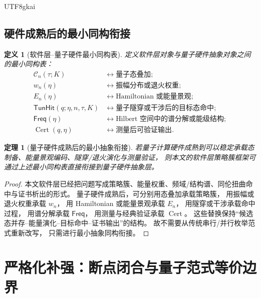 \documentclass[12pt]{article}
\newtheorem{definition}{定义}[section]
\newtheorem{theorem}{定理}[section]
\newcommand{\TunHit}{\mathsf{TunHit}}
\newcommand{\Freq}{\mathsf{Freq}}
\newcommand{\Cert}{\operatorname{Cert}}
\begin{document}
\begin{CJK*}{UTF8}{gkai}
\subsection{硬件成熟后的最小同构衔接}
\label{subsec:tex53-quantum-hardware}

\begin{definition}[软件层--量子硬件最小同构表]
定义软件层对象与量子硬件抽象对象之间的最小同构表：
\[
\begin{aligned}
  \mathcal C_n(\tau;K)
  &\longleftrightarrow
  \text{量子态叠加};\\
  w_n(\eta)
  &\longleftrightarrow
  \text{振幅分布或退火权重};\\
  E_n(\eta)
  &\longleftrightarrow
  \text{Hamiltonian 或能量景观};\\
  \TunHit(q;\eta,n,\tau,K)
  &\longleftrightarrow
  \text{量子隧穿或干涉后的目标态命中};\\
  \Freq(\eta)
  &\longleftrightarrow
  \text{Hilbert 空间中的谱分解或能级结构};\\
  \Cert(q,\eta)
  &\longleftrightarrow
  \text{测量后可验证输出}.
\end{aligned}
\]
\end{definition}

\begin{theorem}[量子硬件成熟后的最小抽象衔接]
\label{thm:tex53-quantum-isomorphism}
若量子计算硬件成熟到可以稳定承载态制备、能量景观编码、隧穿/退火演化与测量验证，
则本文的软件层策略簇框架可通过上述最小同构表直接衔接到量子硬件抽象层。
\end{theorem}

\begin{proof}
本文软件层已经把问题写成策略簇、能量权重、频域/结构谱、同伦扭曲命中与证书析出的形式。
量子硬件成熟后，可分别用态叠加承载策略簇，
用振幅或退火权重承载 \(w_n\)，
用 Hamiltonian 或能量景观承载 \(E_n\)，
用隧穿或干涉承载命中过程，
用谱分解承载 \(\Freq\)，
用测量与经典验证承载 \(\Cert\)。
这些替换保持“候选态并存--能量演化--目标命中--证书输出”的结构。
故不需要从传统串行/并行枚举范式重新改写，
只需进行最小抽象同构衔接。
\end{proof}

\section{严格化补强：断点闭合与量子范式等价边界}
\label{sec:tex53-rigorous-closure}


\end{CJK*}
\end{document}
